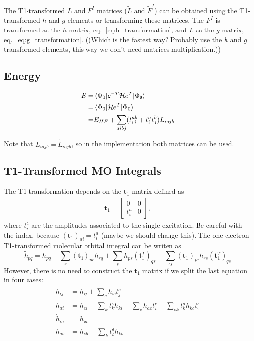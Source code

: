 The T1-transformed $L$ and $F^I$ matrices (${\tilde L}$ and ${\tilde F}^I$) can be obtained using the T1-transformed $h$ and $g$ elements or transforming these matrices.
The $F^I$ is transformed as the $h$ matrix, eq.~\ref{eq:h_transformation}, and $L$ as the $g$ matrix, eq.~\ref{eq:g_transformation}.
((Which is the fastest way? Probably use the $h$ and $g$ transformed elements, this way we don't need matrices multiplication.))

\subsection{Energy}
\hypertarget{sec:ccsd_energy}{}
\label{sec:ccsd_energy}

\begin{equation}
  \begin{split}
    E =& \mel{\Phi_0}{e^{-T}\ensuremath{\mathcal{H}}e^T}{\Phi_0}\\
    =& \mel{\Phi_0}{\ensuremath{\mathcal{H}}e^T}{\Phi_0}\\
    =& E_{HF} + \sum_{aibj}(t_{ij}^{ab} + t_i^at_j^b) L_{iajb}
  \end{split}
\end{equation}

Note that $L_{iajb}={\tilde L}_{iajb}$, so in the implementation both matrices can be used. 

\subsection{T1-Transformed MO Integrals}
\hypertarget{sec:ccsd_t1_trans}{}
\label{sec:ccsd_t1_trans}

The T1-transformation depends on the $\mathbf{t}_1$ matrix defined as
\begin{gather}
  \mathbf{t}_1=
  \begin{bmatrix}
    0     & 0\\
    t_i^a & 0
  \end{bmatrix},
\end{gather}
where $t_i^a$ are the amplitudes associated to the single excitation.
Be careful with the index, because $(\mathbf{t}_1)_{ai}=t_i^a$ (maybe we should change this).
The one-electron T1-transformed molecular orbital integral can be writen as
\begin{equation}
  \label{eq:h_transformation}
  {\tilde h}_{pq}=h_{pq}-\sum_r(\mathbf{t}_1)_{pr}h_{rq}+\sum_sh_{ps}(\mathbf{t}_1^T)_{qs}-\sum_{rs}(\mathbf{t}_1)_{pr}h_{rs}(\mathbf{t}_1^T)_{qs}
\end{equation}
However, there is no need to construct the $\mathbf{t}_1$ matrix if we split the last equation in four cases:
\begin{align}
  {\tilde h}_{ij}&=h_{ij}+\sum_ch_{ic}t_{j}^{c}\\
  {\tilde h}_{ai}&=h_{ai}-\sum_kt_{k}^{a}h_{ki}+\sum_ch_{ac}t_{i}^{c}-\sum_{ck}t_{k}^{a}h_{kc}t_{i}^{c}\\
  {\tilde h}_{ia}&=h_{ia}\\
  {\tilde h}_{ab}&=h_{ab}-\sum_kt_{k}^{a}h_{kb}
\end{align}

